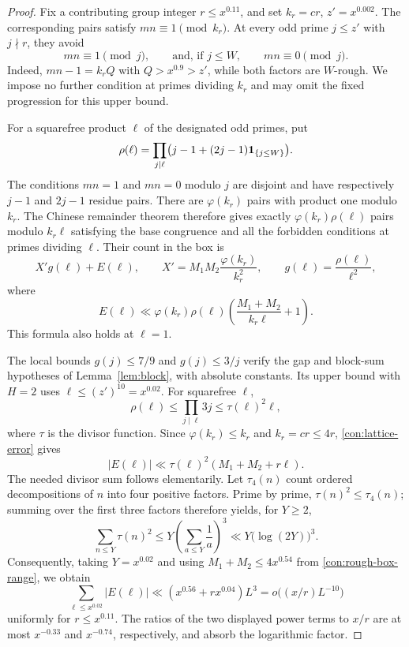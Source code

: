 \begin{proof}
Fix a contributing group integer \(r\le x^{0.11}\), and set
\(k_r=cr\), \(z'=x^{0.002}\).  The corresponding pairs satisfy
\(mn\equiv1\pmod{k_r}\).  At every odd prime \(j\le z'\) with
\(j\nmid r\), they avoid
\begin{equation}\label{con:pair-bad}
 mn\equiv1\pmod j,
 \qquad\text{and, if }j\le W,\qquad mn\equiv0\pmod j.
\end{equation}
Indeed, \(mn-1=k_rQ\) with \(Q>x^{0.9}>z'\), while both factors
are \(W\)-rough.  We impose no further condition at primes dividing
\(k_r\) and may omit the fixed progression for this upper bound.

For a squarefree product \(\ell\) of the designated odd primes,
put
\[
 \rho(\ell)=\prod_{j\mid\ell}
               \bigl(j-1+(2j-1)\mathbf{1}_{\{j\le W\}}\bigr).
\]
The conditions \(mn=1\) and \(mn=0\) modulo \(j\) are disjoint
and have respectively \(j-1\) and \(2j-1\) residue pairs.  There
are \(\varphi(k_r)\) pairs with product one modulo \(k_r\).
The Chinese remainder theorem therefore gives exactly
\(\varphi(k_r)\rho(\ell)\) pairs modulo \(k_r\ell\) satisfying
the base congruence and all the forbidden conditions at primes
dividing \(\ell\).  Their count in the box is
\[
 X'g(\ell)+E(\ell),\qquad
 X'=M_1M_2\frac{\varphi(k_r)}{k_r^2},\qquad
 g(\ell)=\frac{\rho(\ell)}{\ell^2},
\]
where
\begin{equation}\label{con:lattice-error}
 E(\ell)\ll\varphi(k_r)\rho(\ell)
             \left(\frac{M_1+M_2}{k_r\ell}+1\right).
\end{equation}
This formula also holds at \(\ell=1\).

The local bounds \(g(j)\le7/9\) and \(g(j)\le3/j\) verify
the gap and block-sum hypotheses of Lemma~\ref{lem:block}, with
absolute constants.  Its upper bound with \(H=2\) uses
\(\ell\le(z')^{10}=x^{0.02}\). For squarefree \(\ell\),
\[
 \rho(\ell)\le\prod_{j\mid\ell}3j\le\tau(\ell)^2\ell,
\]
where \(\tau\) is the divisor function. Since \(\varphi(k_r)\le k_r\)
and \(k_r=cr\le4r\), \eqref{con:lattice-error} gives
\[
 |E(\ell)|\ll\tau(\ell)^2(M_1+M_2+r\ell).
\]
The needed divisor sum follows elementarily. Let \(\tau_4(n)\)
count ordered decompositions of \(n\) into four positive factors.
Prime by prime, \(\tau(n)^2\le\tau_4(n)\); summing over the
first three factors therefore yields, for \(Y\ge2\),
\[
 \sum_{n\le Y}\tau(n)^2
 \le Y\left(\sum_{a\le Y}\frac1a\right)^3
 \ll Y\bigl(\log(2Y)\bigr)^3.
\]
Consequently, taking \(Y=x^{0.02}\) and using
\(M_1+M_2\le4x^{0.54}\) from \eqref{con:rough-box-range}, we obtain
\begin{equation}\label{con:lattice-sum}
 \sum_{\ell\le x^{0.02}}|E(\ell)|
       \ll (x^{0.56}+rx^{0.04})L^3
       =o\bigl((x/r)L^{-10}\bigr)
\end{equation}
uniformly for \(r\le x^{0.11}\).  The ratios of the two displayed
power terms to \(x/r\) are at most \(x^{-0.33}\) and
\(x^{-0.74}\), respectively, and absorb the logarithmic factor.


\end{proof}
